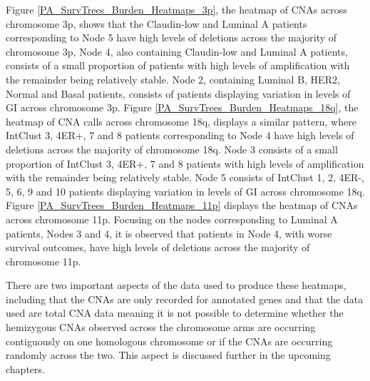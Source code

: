 Figure \ref{PA_SurvTrees_Burden_Heatmaps_3p}, the heatmap of CNAs across chromosome 3p, shows that the Claudin-low and Luminal A patients corresponding to Node 5 have high levels of deletions across the majority of chromosome 3p, Node 4, also containing Claudin-low and Luminal A patients, consists of a small proportion of patients with high levels of amplification with the remainder being relatively stable. Node 2, containing Luminal B, HER2, Normal and Basal patients, consists of patients displaying variation in levels of GI across chromosome 3p. Figure \ref{PA_SurvTrees_Burden_Heatmaps_18q}, the heatmap of CNA calls across chromosome 18q, displays a similar pattern, where IntClust 3, 4ER+, 7 and 8 patients corresponding to Node 4 have high levels of deletions across the majority of chromosome 18q. Node 3 consists of a small proportion of IntClust 3, 4ER+, 7 and 8 patients with high levels of amplification with the remainder being relatively stable. Node 5 consists of IntClust 1, 2, 4ER-, 5, 6, 9 and 10 patients displaying variation in levels of GI across chromosome 18q. Figure \ref{PA_SurvTrees_Burden_Heatmaps_11p} displays the heatmap of CNAs across chromosome 11p. Focusing on the nodes corresponding to Luminal A patients, Nodes 3 and 4, it is observed that patients in Node 4, with worse survival outcomes, have high levels of deletions across the majority of chromosome 11p.

There are two important aspects of the data used to produce these heatmaps, including that the CNAs are only recorded for annotated genes and that the data used are total CNA data meaning it is not possible to determine whether the hemizygous CNAs observed across the chromosome arms are occurring contiguously on one homologous chromosome or if the CNAs are occurring randomly across the two. This aspect is discussed further in the upcoming chapters. 

\vfill 

